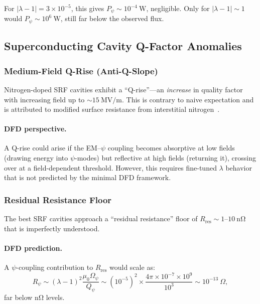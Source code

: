 \documentclass[aps,prd,twocolumn,showpacs,preprintnumbers,superscriptaddress,nofootinbib]{revtex4-2}
\newcommand{\Opsi}{\Omega_\psi}
\begin{document}
For $|\lambda-1| = 3\times 10^{-5}$, this gives $P_\psi \sim 10^{-4}~\mathrm{W}$,
negligible.  Only for $|\lambda-1| \sim 1$ would
$P_\psi \sim 10^{6}~\mathrm{W}$, still far below the observed flux.

\subsection{Superconducting Cavity Q-Factor Anomalies}\label{sec:Q-anomaly}

\subsubsection{Medium-Field Q-Rise (Anti-Q-Slope)~\cite{Romanenko2014}}

Nitrogen-doped SRF cavities exhibit a ``Q-rise''---an \emph{increase}
in quality factor with increasing field up to $\sim 15~\mathrm{MV/m}$.
This is contrary to naive expectation and is attributed to modified
surface resistance from interstitial nitrogen~\cite{Grassellino2017}.

\paragraph{DFD perspective.}
A Q-rise could arise if the EM--$\psi$ coupling becomes absorptive at
low fields (drawing energy into $\psi$-modes) but reflective at
high fields (returning it), crossing over at a field-dependent
threshold.  However, this requires fine-tuned $\lambda$ behavior that
is not predicted by the minimal DFD framework.

\subsubsection{Residual Resistance Floor~\cite{Padamsee2009}}

The best SRF cavities approach a ``residual resistance'' floor of
$R_{\mathrm{res}} \sim 1$--$10~\mathrm{n\Omega}$ that is imperfectly
understood.

\paragraph{DFD prediction.}
A $\psi$-coupling contribution to $R_{\mathrm{res}}$ would scale as:
\begin{equation}
R_\psi \sim (\lambda-1)^2\frac{\mu_0\Opsi}{Q_\psi}
  \sim (10^{-5})^2\times\frac{4\pi\times 10^{-7}\times 10^9}{10^3}
  \sim 10^{-13}~\Omega,
\end{equation}
far below $\mathrm{n\Omega}$ levels.
\end{document}
